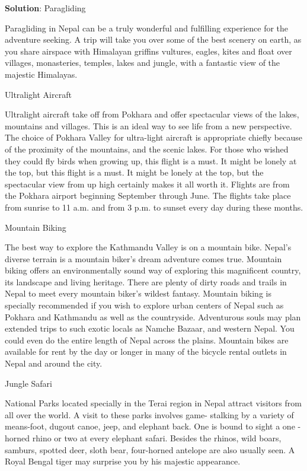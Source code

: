 \documentclass[
  openany]{book}
\newenvironment{solution}{ {\bfseries Solution}:}{}
\begin{document}
\begin{questions}
\begin{solution}
Paragliding

Paragliding in Nepal can be a truly wonderful and fulfilling experience for the adventure seeking. A trip will take you over some of the best scenery on earth, as you share airspace with Himalayan griffins vultures, eagles, kites and float over villages, monasteries, temples, lakes and jungle, with a fantastic view of the majestic Himalayas.

Ultralight Aircraft

Ultralight aircraft take off from Pokhara and offer spectacular views of the lakes, mountains and villages. This is an ideal way to see life from a new perspective. The choice of Pokhara Valley for ultra-light aircraft is appropriate chiefly because of the proximity of the mountains, and the scenic lakes. For those who wished they could fly birds when growing up, this flight is a must. It might be lonely at the top, but this flight is a must. It might be lonely at the top, but the spectacular view from up high certainly makes it all worth it. Flights are from the Pokhara airport beginning September through June. The flights take place from sunrise to 11 a.m. and from 3 p.m. to sunset every day during these months.

Mountain Biking

The best way to explore the Kathmandu Valley is on a mountain bike. Nepal’s diverse terrain is a mountain biker’s dream adventure comes true. Mountain biking offers an environmentally sound way of exploring this magnificent country, its landscape and living heritage. There are plenty of dirty roads and trails in Nepal to meet every mountain biker’s wildest fantasy. Mountain biking is specially recommended if you wish to explore urban centers of Nepal such as Pokhara and Kathmandu as well as the countryside. Adventurous souls may plan extended trips to such exotic locals as Namche Bazaar, and western Nepal. You could even do the entire length of Nepal across the plains. Mountain bikes are available for rent by the day or longer in many of the bicycle rental outlets in Nepal and around the city.

Jungle Safari

National Parks located specially in the Terai region in Nepal attract visitors from all over the world. A visit to these parks involves game- stalking by a variety of means-foot, dugout canoe, jeep, and elephant back. One is bound to sight a one - horned rhino or two at every elephant safari. Besides the rhinos, wild boars, samburs, spotted deer, sloth bear, four-horned antelope are also usually seen. A Royal Bengal tiger may surprise you by his majestic appearance.


\end{solution}
\end{questions}
\end{document}
